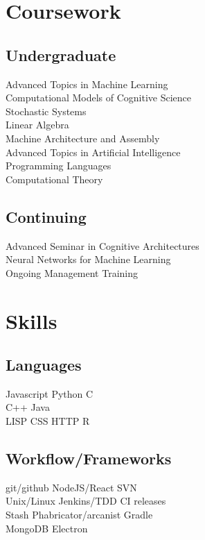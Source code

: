 \documentclass[]{csaund_resume-openfont}
\begin{document}
\begin{minipage}[t]{0.33\textwidth}
\section{Coursework}
\subsection{Undergraduate}
Advanced Topics in Machine Learning \\
Computational Models of Cognitive Science \\
Stochastic Systems \\
Linear Algebra \\
Machine Architecture and Assembly \\
Advanced Topics in Artificial Intelligence \\
Programming Languages \\
Computational Theory \\
\sectionsep

\subsection{Continuing}
Advanced Seminar in Cognitive Architectures \\
Neural Networks for Machine Learning \\
Ongoing Management Training


\section{Skills}
\subsection{Languages}
Javascript \textbullet{} Python \textbullet{} C \\
C++ \textbullet{} Java  \\
LISP \textbullet{} CSS \textbullet{} HTTP \textbullet{} R \\
\vspace{\topsep} %
\subsection{Workflow/Frameworks}
git/github \textbullet{} NodeJS/React \textbullet{} SVN \textbullet{} \\
 Unix/Linux \textbullet{} Jenkins/TDD \textbullet{} CI releases \\
 Stash \textbullet{} Phabricator/arcanist \textbullet{} Gradle \\
 MongoDB \textbullet{} Electron 
\sectionsep

%
%

\end{minipage}
\end{document}
